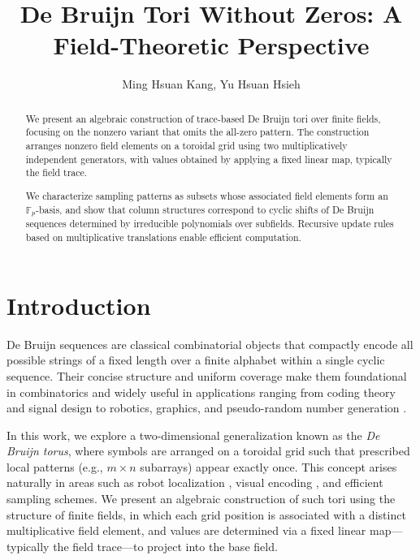 \documentclass{article}
\title{De Bruijn Tori Without Zeros: A Field-Theoretic Perspective}
\author{Ming Hsuan Kang, Yu Hsuan Hsieh}
\date{}
\begin{document}
\def \tr{\mathrm{tr}}




\maketitle


\begin{abstract}
We present an algebraic construction of trace-based De Bruijn tori over finite fields, focusing on the nonzero variant that omits the all-zero pattern. The construction arranges nonzero field elements on a toroidal grid using two multiplicatively independent generators, with values obtained by applying a fixed linear map, typically the field trace.

We characterize sampling patterns as subsets whose associated field elements form an \( \mathbb{F}_p \)-basis, and show that column structures correspond to cyclic shifts of De Bruijn sequences determined by irreducible polynomials over subfields. Recursive update rules based on multiplicative translations enable efficient computation.
\end{abstract}



\section{Introduction}

De Bruijn sequences are classical combinatorial objects that compactly encode all possible strings of a fixed length over a finite alphabet within a single cyclic sequence. Their concise structure and uniform coverage make them foundational in combinatorics and widely useful in applications ranging from coding theory and signal design to robotics, graphics, and pseudo-random number generation \cite{debruijn1946circuits,fredricksen1982survey,alhakim2014survey}.

In this work, we explore a two-dimensional generalization known as the \emph{De Bruijn torus}, where symbols are arranged on a toroidal grid such that prescribed local patterns (e.g., \( m \times n \) subarrays) appear exactly once. This concept arises naturally in areas such as robot localization \cite{caceres2014designing}, visual encoding \cite{galbiati2020debruijn}, and efficient sampling schemes. We present an algebraic construction of such tori using the structure of finite fields, in which each grid position is associated with a distinct multiplicative field element, and values are determined via a fixed linear map—typically the field trace—to project into the base field.
\end{document}

